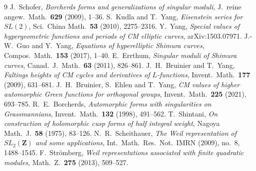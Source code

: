\documentclass[11pt,reqno]{amsart}
\theoremstyle{plain}
\theoremstyle{definition}
\begin{document}
\begin{thebibliography}{9}
 J.~Schofer, \emph{Borcherds forms and generalizations of singular moduli},
J.\ reine angew.\ Math.\ \textbf{629} (2009), 1--36.
 S.~Kudla and T.~Yang, \emph{Eisenstein series for $SL(2)$},
Sci.\ China Math.\ \textbf{53} (2010), 2275--2316.
 Y.~Yang, \emph{Special values of hypergeometric functions and periods of CM elliptic
curves}, arXiv:1503.07971.
 J.-W.~Guo and Y.~Yang, \emph{Equations of hyperelliptic Shimura curves},
Compos.\ Math.\ \textbf{153} (2017), 1--40.
 E.~Errthum, \emph{Singular moduli of Shimura curves}, Canad.\ J.\ Math.\ \textbf{63}
(2011), 826--861.
 J.~H.~Bruinier and T.~Yang, \emph{Faltings heights of CM cycles and derivatives of
$L$-functions}, Invent.\ Math.\ \textbf{177} (2009), 631--681.
 J.~H.~Bruinier, S.~Ehlen and T.~Yang, \emph{CM values of higher automorphic Green
functions for orthogonal groups}, Invent.\ Math.\ \textbf{225} (2021), 693--785.
 R.~E.~Borcherds, \emph{Automorphic forms with singularities on Grassmannians},
Invent.\ Math.\ \textbf{132} (1998), 491--562.
 T.~Shintani, \emph{On construction of holomorphic cusp forms of half integral
weight}, Nagoya Math.\ J.\ \textbf{58} (1975), 83--126.
 N.~R.~Scheithauer, \emph{The Weil representation of $SL_2(\mathbf Z)$ and some
applications}, Int.\ Math.\ Res.\ Not.\ IMRN (2009), no.~8, 1488--1545.
 F.~Str\"omberg, \emph{Weil representations associated with finite quadratic
modules}, Math.\ Z.\ \textbf{275} (2013), 509--527.
\end{thebibliography}
\end{document}
